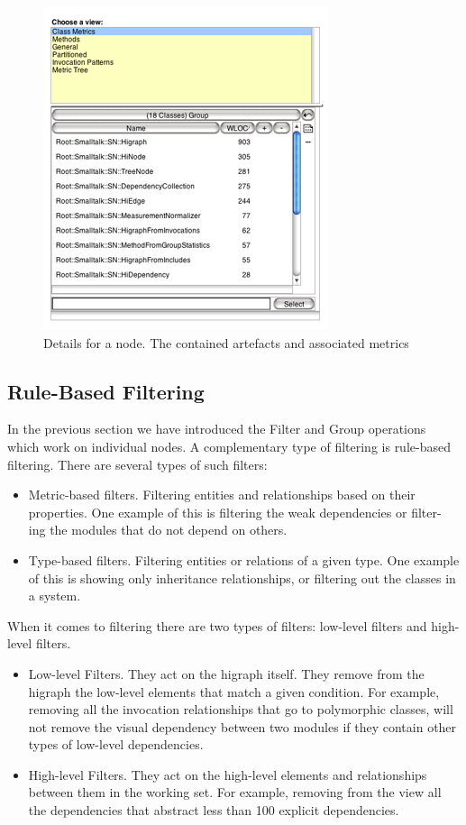 \documentclass[preprint,12pt]{elsarticle}
\begin{document}
\begin{figure}[h]
\begin{center}
\includegraphics[width=0.5\linewidth]{images/DetailForNode.png}
\caption{Details for a node. The contained artefacts and associated metrics}
\label{}
\end{center}
\end{figure}


\newpage
\subsection {Rule-Based Filtering}

In the previous section we have introduced the Filter and Group operations which work on individual nodes. A complementary type of filtering is rule-based filtering. There are several types of such filters:

\begin{itemize}
\item Metric-based filters. Filtering entities and relationships based on their properties. One example of this is filtering the weak dependencies or filter- ing the modules that do not depend on others.
\item Type-based filters. Filtering entities or relations of a given type. One example of this is showing only inheritance relationships, or filtering out the classes in a system.
\end{itemize}



When it comes to filtering there are two types of filters: low-level filters and high-level filters.

\begin{itemize}

\item Low-level Filters. They act on the higraph itself. They remove from the higraph the low-level elements that match a given condition. For example, removing all the invocation relationships that go to polymorphic classes, will not remove the visual dependency between two modules if they contain other types of low-level dependencies.

\item High-level Filters. They act on the high-level elements and relationships between them in the working set. For example, removing from the view all the dependencies that abstract less than 100 explicit dependencies.

\end{itemize}
\end{document}

